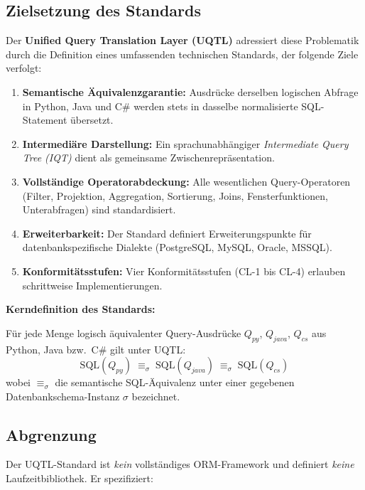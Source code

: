 \subsection{Zielsetzung des Standards}
\label{subsec:ziel}

Der \textbf{Unified Query Translation Layer (UQTL)} adressiert diese Problematik
durch die Definition eines umfassenden technischen Standards, der folgende
Ziele verfolgt:

\begin{enumerate}[leftmargin=1.5cm]
  \item \textbf{Semantische Äquivalenzgarantie:} Ausdrücke derselben logischen
    Abfrage in Python, Java und C\# werden stets in dasselbe normalisierte
    SQL-Statement übersetzt.
  \item \textbf{Intermediäre Darstellung:} Ein sprachunabhängiger
    \emph{Intermediate Query Tree (IQT)} dient als gemeinsame Zwischenrepräsentation.
  \item \textbf{Vollständige Operatorabdeckung:} Alle wesentlichen
    Query-Operatoren (Filter, Projektion, Aggregation, Sortierung, Joins,
    Fensterfunktionen, Unterabfragen) sind standardisiert.
  \item \textbf{Erweiterbarkeit:} Der Standard definiert Erweiterungspunkte
    für datenbankspezifische Dialekte (PostgreSQL, MySQL, Oracle, MSSQL).
  \item \textbf{Konformitätsstufen:} Vier Konformitätsstufen (CL-1 bis CL-4)
    erlauben schrittweise Implementierungen.
\end{enumerate}

\begin{infobox}
\textbf{Kerndefinition des Standards:}

Für jede Menge logisch äquivalenter Query-Ausdrücke $Q_{py}$, $Q_{java}$,
$Q_{cs}$ aus Python, Java bzw.\ C\# gilt unter UQTL:
\[
  \mathrm{SQL}(Q_{py}) \;\equiv_\sigma\; \mathrm{SQL}(Q_{java})
  \;\equiv_\sigma\; \mathrm{SQL}(Q_{cs})
\]
wobei $\equiv_\sigma$ die semantische SQL-Äquivalenz unter einer gegebenen
Datenbankschema-Instanz $\sigma$ bezeichnet.
\end{infobox}

\subsection{Abgrenzung}
\label{subsec:abgrenzung}

Der UQTL-Standard ist \emph{kein} vollständiges ORM-Framework und definiert
\emph{keine} Laufzeitbibliothek. Er spezifiziert:

